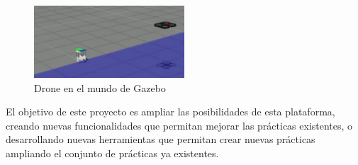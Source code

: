 \begin{itemize}
\begin{figure}[H]
  \begin{center}
    \includegraphics[width=0.5\textwidth]{figures/Introduccion/Tortuga.png}
		\caption{Drone en el mundo de Gazebo}
		\label{fig.Tortuga}
		\end{center}
\end{figure}
\end{itemize}

El objetivo de este proyecto es ampliar las posibilidades de esta plataforma, creando nuevas funcionalidades que permitan mejorar las prácticas existentes, o desarrollando nuevas herramientas que permitan crear nuevas prácticas ampliando el conjunto de prácticas ya existentes.\\